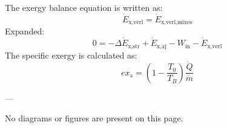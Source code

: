The exergy balance equation is written as:  
\[
\dot{E}_{\text{x,verl}} = \dot{E}_{\text{x,verl,mixes}}
\]  
Expanded:  
\[
0 = -\Delta \dot{E}_{\text{x,str}} + \dot{E}_{\text{x,aj}} - W_{\text{in}} - \dot{E}_{\text{x,verl}}
\]  
The specific exergy is calculated as:  
\[
ex_{\text{a}} = \left( 1 - \frac{T_0}{T_B} \right) \frac{\dot{Q}}{\dot{m}}
\]  

---

No diagrams or figures are present on this page.